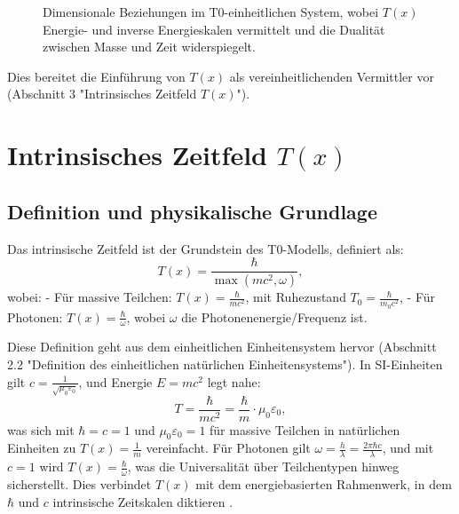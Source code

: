\documentclass[12pt,a4paper]{article}
\newcommand{\Tfield}{T(x)}
\newcommand{\Tzero}{T_0}
\begin{document}
	\begin{figure}[ht]
		\centering
		\caption{Dimensionale Beziehungen im T0-einheitlichen System, wobei \(\Tfield\) Energie- und inverse Energieskalen vermittelt und die Dualität zwischen Masse und Zeit widerspiegelt.}
		\label{fig:dimensions}
	\end{figure}
	
	Dies bereitet die Einführung von \(\Tfield\) als vereinheitlichenden Vermittler vor (Abschnitt 3 "Intrinsisches Zeitfeld \(\Tfield\)").
	
	\section{Intrinsisches Zeitfeld \(\Tfield\)}
	\label{sec:intrinsic_time}
	
	\subsection{Definition und physikalische Grundlage}
	\label{subsec:time_definition}
	
	Das intrinsische Zeitfeld ist der Grundstein des T0-Modells, definiert als:
	\begin{equation}
		\Tfield = \frac{\hbar}{\max(mc^2, \omega)},
		\label{eq:intrinsic_time}
	\end{equation}
	wobei:
	- Für massive Teilchen: \(\Tfield = \frac{\hbar}{mc^2}\), mit Ruhezustand \(\Tzero = \frac{\hbar}{m_0 c^2}\),
	- Für Photonen: \(\Tfield = \frac{\hbar}{\omega}\), wobei \(\omega\) die Photonenenergie/Frequenz ist.
	
	Diese Definition geht aus dem einheitlichen Einheitensystem hervor (Abschnitt 2.2 "Definition des einheitlichen natürlichen Einheitensystems"). In SI-Einheiten gilt \(c = \frac{1}{\sqrt{\mu_0\varepsilon_0}}\), und Energie \(E = mc^2\) legt nahe:
	\begin{equation}
		T = \frac{\hbar}{mc^2} = \frac{\hbar}{m} \cdot \mu_0\varepsilon_0,
		\label{eq:time_em}
	\end{equation}
	was sich mit \(\hbar = c = 1\) und \(\mu_0\varepsilon_0 = 1\) für massive Teilchen in natürlichen Einheiten zu \(\Tfield = \frac{1}{m}\) vereinfacht. Für Photonen gilt \(\omega = \frac{h}{\lambda} = \frac{2\pi\hbar c}{\lambda}\), und mit \(c = 1\) wird \(\Tfield = \frac{\hbar}{\omega}\), was die Universalität über Teilchentypen hinweg sicherstellt. Dies verbindet \(\Tfield\) mit dem energiebasierten Rahmenwerk, in dem \(\hbar\) und \(c\) intrinsische Zeitskalen diktieren \cite{pascher_lagrange_2025}.
	
\end{document}
